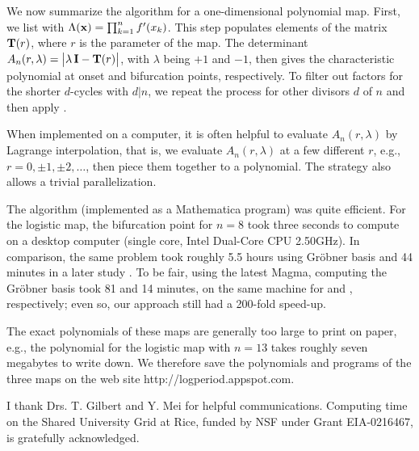 \documentclass{ws-ijbc}
\begin{document}
We now summarize the algorithm for a one-dimensional polynomial map.
%
First, we list   with $\Lambda(\mathbf{x}) = \prod_{k=1}^n f'(x_k)$.
This step populates elements of the matrix $\mathbf{T}(r)$,
where $r$ is the parameter of the map.
%
The determinant $A_n(r, \lambda) = \big|\lambda \, \mathbf{I} - \mathbf{T}(r)\big|$,
with $\lambda$ being $+1$ and $-1$, then gives the characteristic
polynomial at onset and bifurcation points, respectively.
%
To filter out factors for the shorter $d$-cycles with $d|n$,
  we repeat the process for other divisors $d$ of $n$
  and then apply .
%


When implemented on a computer,
it is often helpful to evaluate $A_n(r,\lambda)$ by Lagrange interpolation,
that is, we evaluate $A_n(r, \lambda)$ at a few different $r$,
e.g., $r = 0, \pm1, \pm2,\ldots$, then piece them together
to a polynomial.
The strategy also allows a trivial parallelization.



The algorithm (implemented as a Mathematica program)
was quite efficient.
%
For the logistic map, the bifurcation point for $n = 8$
took three seconds to compute on a desktop computer
(single core, Intel\textsuperscript{\textregistered} Dual-Core CPU 2.50GHz).
%
In comparison,
  the same problem took roughly 5.5 hours \cite{kk1}
  using Gr\"obner basis
  and 44 minutes in a later study \cite{lewis}.
To be fair, using the latest Magma, computing the Gr\"obner basis
  took 81 and 14 minutes, on the same machine
  for  and , respectively;
even so, our approach still had a 200-fold speed-up.




%
The exact polynomials of these maps are generally too large to print on paper,
  e.g., the polynomial for the logistic map with $n = 13$
    takes roughly seven megabytes to write down.
%
We therefore save the polynomials and programs of the three maps on the web site
http://logperiod.appspot.com.





 \noindent
I thank Drs. T. Gilbert and Y. Mei for helpful communications.
Computing time on the Shared University Grid at Rice,
funded by NSF under Grant EIA-0216467, is gratefully acknowledged.
\end{document}

